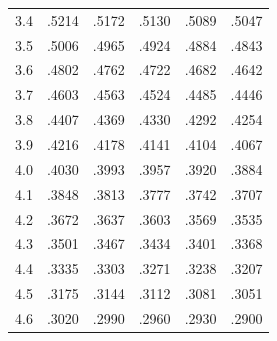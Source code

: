\begin{minipage}[t]{95mm}
{\begin{tabular}{cccccc}
        3.4            & .5214                    & .5172                    & .5130                    & .5089                    & .5047                    \\
        3.5            & .5006                    & .4965                    & .4924                    & .4884                    & .4843                    \\
        3.6            & .4802                    & .4762                    & .4722                    & .4682                    & .4642                    \\
        3.7            & .4603                    & .4563                    & .4524                    & .4485                    & .4446                    \\
        3.8            & .4407                    & .4369                    & .4330                    & .4292                    & .4254                    \\
        3.9            & .4216                    & .4178                    & .4141                    & .4104                    & .4067                    \\[1.5ex]
        4.0            & .4030                    & .3993                    & .3957                    & .3920                    & .3884                    \\
        4.1            & .3848                    & .3813                    & .3777                    & .3742                    & .3707                    \\
        4.2            & .3672                    & .3637                    & .3603                    & .3569                    & .3535                    \\
        4.3            & .3501                    & .3467                    & .3434                    & .3401                    & .3368                    \\
        4.4            & .3335                    & .3303                    & .3271                    & .3238                    & .3207                    \\
        4.5            & .3175                    & .3144                    & .3112                    & .3081                    & .3051                    \\
        4.6            & .3020                    & .2990                    & .2960                    & .2930                    & .2900                    \\

\end{tabular}}
\end{minipage}
